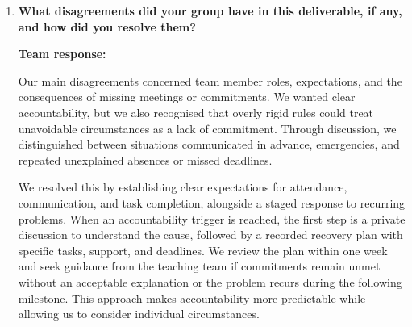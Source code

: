 \documentclass{article}
\begin{document}
\begin{enumerate}
    Our documentation pipeline made this risk concrete: it reported success
    while uploading an outdated PDF because change detection failed and
    compilation was skipped. This showed me that a successful status is
    only useful if the intended checks actually ran. For future workflows,
    I would verify both failure handling and the generated output, rather
    than relying on the status alone.

    \textbf{Shamil Canbolat:}

    CI/CD did not seem worth it to me at the beginning because the
    disadvantages are more apparent at first than the disadvantages. CI/CD
    can seem like a waste of time, requiring effort to configure and time
    to get used to using. It can be bloated and slow, requiring builds
    and automated testing for simple commits. As the development continues,
    time must be allocated to update and maintain checks and deployment tests.
    
    But the advantages outweigh the disadvantages. Bugs are caught early, 
    prevented more time being wasted on debugging later on. In addition to 
    saving time by eliminating manual builds and limiting human validation, 
    deployment tests force you to begin thinking of edge cases, risks, and
    output domain early on, making later system testing easier. Builds, in 
    our case PDF generation, has been very beneficial for catching formatting
    errors, seeing blame with highlighted colors, and comparing revisions to
    older commits. False positives and negatives are bound to occur, but this 
    will allow us to improve the deployment and improve the robustness of the 
    checking each time we catch a mistake with the pipeline.


    \item \textbf{What disagreements did your group have in this
    deliverable, if any, and how did you resolve them?}

    \textbf{Team response:}

    Our main disagreements concerned team member roles, expectations, and
    the consequences of missing meetings or commitments. We wanted clear
    accountability, but we also recognised that overly rigid rules could
    treat unavoidable circumstances as a lack of commitment. Through
    discussion, we distinguished between situations communicated in advance,
    emergencies, and repeated unexplained absences or missed deadlines.

    We resolved this by establishing clear expectations for attendance,
    communication, and task completion, alongside a staged response to
    recurring problems. When an accountability trigger is reached,
    the first step is a private discussion to understand the cause,
    followed by a recorded recovery plan with specific tasks, support,
    and deadlines. We review the plan within one week and seek guidance
    from the teaching team if commitments remain unmet without an
    acceptable explanation or the problem recurs during the following
    milestone. This approach makes accountability more predictable
    while allowing us to consider individual circumstances.


\end{enumerate}
\end{document}
